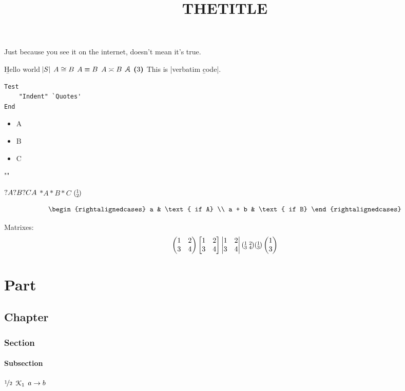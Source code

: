 \documentclass[questionmark=mathcal, asterisk=sz, shortverb, smallheader, smallmargins]{hw}
\title{THETITLE}
\begin{document}
\begin{displayquote}
Just because you see it on the internet, doesn't mean it's true.
\end{displayquote}



\b{Hello world $\sz{S}$ $A \iso B$ $A \con B$ $A \creq B$ $\ayy$ $\bpar{3}$}
This is |verbatim \b code|.

\begin{Verbatim}
Test
	"Indent" `Quotes'
End	
\end{Verbatim}


\begin{itemize}
	\item A
	\item B
	\item C
\end{itemize}

\thm "\thm"

$?A ?B ?C \questionMarkCommand{A}$
$*A *B *C$
$\pt{1;2}$

\[
\begin{rightalignedcases}
    a & \text{ if A} \\
    a + b & \text{ if B}
\end{rightalignedcases} 
\]

Matrixes:
\[
\mx{1 & 2 \\ 3 & 4}
\bmx{1 & 2 \\ 3 & 4}
\detmx{1 & 2 \\ 3 & 4}
\smx{1 & 2 \\ 3 & 4}
\pt{1 ; 3}
\dpt{1 ; 3}
\]

\part{Part}
\chapter{Chapter}
\section{Section}
\subsection{Subsection}

 $\sf{1}{2}$
$\kay[1]$
$\from{a} b$



\end{document}
